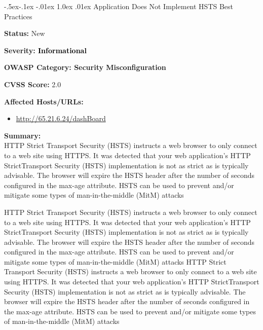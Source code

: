 \documentclass{article}
\makeatletter
\renewcommand{\subsection}{\@startsection{subsection}{2}{\z@}%
            {-.5ex\@plus -.1ex \@minus -.01ex}%
            {1.0ex \@plus .01ex}%
            {\normalfont\large\color{subsectioncolor}}}
\makeatother
\begin{document}
                \subsection{\large Application Does Not Implement HSTS Best Practices}
                \begin{description}[itemsep=2pt, leftmargin=0.2cm]
                    \item \large \textbf{Status:} New
                    \item \large \textbf{Severity: \textcolor{infotext} {Informational}}
                    \item \large \textbf{OWASP Category: Security Misconfiguration}
                    \item \large \textbf{CVSS Score:} 2.0 
                    \item \large \textbf{Affected Hosts/URLs:}
                           \begin{itemize} 
                           \item \large \href{http://65.21.6.24/dashBoard} {http://65.21.6.24/dashBoard}
                           \end{itemize}
                    \item \large \textbf{Summary:} \\  HTTP Strict Transport Security (HSTS) instructs a web browser to only connect to a web site using HTTPS. It was detected that your web application's HTTP StrictTransport Security (HSTS) implementation is not as strict as is typically advisable.
 The browser will expire the HSTS header after the number of seconds configured in the max-age attribute. HSTS can be used to prevent and/or mitigate some types of man-in-the-middle (MitM) attacks 

HTTP Strict Transport Security (HSTS) instructs a web browser to only connect to a web site using HTTPS. It was detected that your web application's HTTP StrictTransport Security (HSTS) implementation is not as strict as is typically advisable.
 The browser will expire the HSTS header after the number of seconds configured in the max-age attribute. HSTS can be used to prevent and/or mitigate some types of man-in-the-middle (MitM) attacks 
HTTP Strict Transport Security (HSTS) instructs a web browser to only connect to a web site using HTTPS. It was detected that your web application's HTTP StrictTransport Security (HSTS) implementation is not as strict as is typically advisable.
 The browser will expire the HSTS header after the number of seconds configured in the max-age attribute. HSTS can be used to prevent and/or mitigate some types of man-in-the-middle (MitM) attacks 


\end{description}
\end{document}
